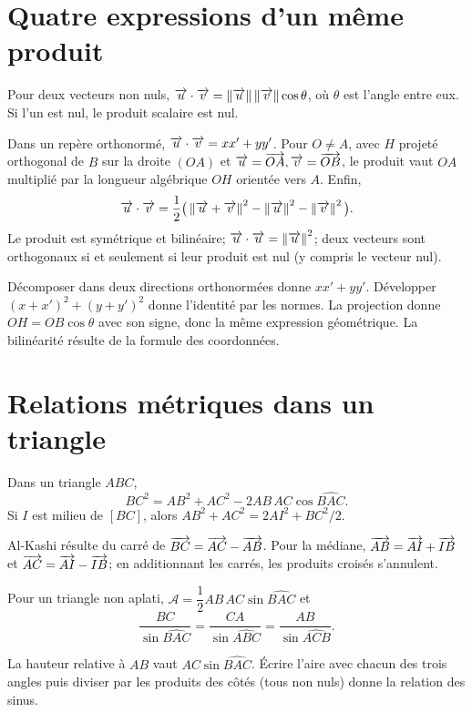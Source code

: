 \section{Quatre expressions d’un même produit}
\begin{definition}Pour deux vecteurs non nuls, $\overrightarrow{u}\cdot\overrightarrow{v}=\left\lVert \overrightarrow{u} \right\rVert\left\lVert \overrightarrow{v} \right\rVert\cos\theta$, où $\theta$ est l’angle entre eux. Si l’un est nul, le produit scalaire est nul.\end{definition}
\begin{propriete}
Dans un repère orthonormé, $\overrightarrow{u}\cdot\overrightarrow{v}=xx'+yy'$. Pour $O\ne A$, avec $H$ projeté orthogonal de $B$ sur la droite $(OA)$ et $\overrightarrow{u}=\overrightarrow{OA},\overrightarrow{v}=\overrightarrow{OB}$, le produit vaut $OA$ multiplié par la longueur algébrique $OH$ orientée vers $A$. Enfin,
\[
\overrightarrow{u}\cdot\overrightarrow{v}=\frac12\big(\left\lVert \overrightarrow{u}+\overrightarrow{v} \right\rVert^2-\left\lVert \overrightarrow{u} \right\rVert^2-\left\lVert \overrightarrow{v} \right\rVert^2\big).
\]
Le produit est symétrique et bilinéaire; $\overrightarrow{u}\cdot\overrightarrow{u}=\left\lVert \overrightarrow{u} \right\rVert^2$; deux vecteurs sont orthogonaux si et seulement si leur produit est nul (y compris le vecteur nul).
\end{propriete}
\begin{demonstration}Décomposer dans deux directions orthonormées donne $xx'+yy'$. Développer $(x+x')^2+(y+y')^2$ donne l’identité par les normes. La projection donne $OH=OB\cos\theta$ avec son signe, donc la même expression géométrique. La bilinéarité résulte de la formule des coordonnées.\end{demonstration}
\section{Relations métriques dans un triangle}
\begin{propriete}Dans un triangle $ABC$,
\[
BC^2=AB^2+AC^2-2AB\,AC\cos\widehat{BAC}.
\]
Si $I$ est milieu de $[BC]$, alors $AB^2+AC^2=2AI^2+BC^2/2$.
\end{propriete}
\begin{demonstration}Al-Kashi résulte du carré de $\overrightarrow{BC}=\overrightarrow{AC}-\overrightarrow{AB}$. Pour la médiane, $\overrightarrow{AB}=\overrightarrow{AI}+\overrightarrow{IB}$ et $\overrightarrow{AC}=\overrightarrow{AI}-\overrightarrow{IB}$; en additionnant les carrés, les produits croisés s’annulent.\end{demonstration}
\begin{propriete}Pour un triangle non aplati, $\mathcal A=\dfrac12 AB\,AC\sin\widehat{BAC}$ et
\[
\frac{BC}{\sin\widehat{BAC}}=
\frac{CA}{\sin\widehat{ABC}}=
\frac{AB}{\sin\widehat{ACB}}.
\]
\end{propriete}
\begin{demonstration}La hauteur relative à $AB$ vaut $AC\sin\widehat{BAC}$. Écrire l’aire avec chacun des trois angles puis diviser par les produits des côtés (tous non nuls) donne la relation des sinus.\end{demonstration}

